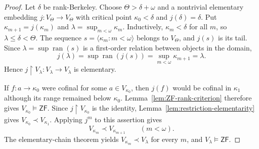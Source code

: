 \documentclass[11pt,a4paper]{amsart}
\newcommand{\ZF}{\mathsf{ZF}}
\newcommand{\restr}{\mathbin{\upharpoonright}}
\theoremstyle{plain}
\theoremstyle{definition}
\theoremstyle{remark}
\begin{document}
\begin{proof}
 Let $\delta$ be rank-Berkeley.  Choose $\Theta>\delta+\omega$ and a nontrivial elementary embedding $j:V_\Theta\longrightarrow V_\Theta$ with critical point $\kappa_0<\delta$ and $j(\delta)=\delta$.  Put $\kappa_{m+1}=j(\kappa_m)$ and $\lambda=\sup_{m<\omega}\kappa_m$.  Inductively, $\kappa_m<\delta$ for all $m$, so $\lambda\leq\delta<\Theta$.  The sequence $s=\langle\kappa_m:m<\omega\rangle$ belongs to $V_\Theta$, and $j(s)$ is its tail.  Since $\lambda=\sup\operatorname{ran}(s)$ is a first-order relation between objects in the domain,
\[
j(\lambda)=\sup\operatorname{ran}(j(s))=\sup_{m<\omega}\kappa_{m+1}=\lambda.
\]
Hence $j\restr V_\lambda:V_\lambda\to V_\lambda$ is elementary.

If $f:a\to\kappa_0$ were cofinal for some $a\in V_{\kappa_0}$, then $j(f)$ would be cofinal in $\kappa_1$ although its range remained below $\kappa_0$.  Lemma~\ref{lem:ZF-rank-criterion} therefore gives $V_{\kappa_0}\models\ZF$.  Since $j\restr V_{\kappa_0}$ is the identity, Lemma~\ref{lem:restriction-elementarity} gives $V_{\kappa_0}\prec V_{\kappa_1}$.  Applying $j^m$ to this assertion gives
\[
V_{\kappa_m}\prec V_{\kappa_{m+1}}\qquad(m<\omega).
\]
The elementary-chain theorem yields $V_{\kappa_m}\prec V_\lambda$ for every $m$, and $V_\lambda\models\ZF$.


\end{proof}
\end{document}
